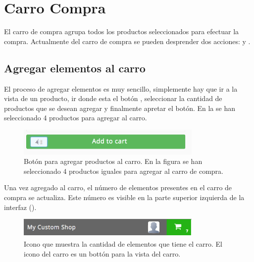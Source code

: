\section{Carro Compra}
	El carro de compra agrupa todos los productos seleccionados para efectuar la compra. Actualmente del carro de compra se pueden desprender dos acciones:  y .

	\subsection{Agregar elementos al carro}\label{chapter:section:carro_compra:subsection:add}
		El proceso de agregar elementos es muy sencillo, simplemente hay que ir a la vista de un producto, ir donde esta el botón \addtocartLABEL, seleccionar la cantidad de productos que se desean agregar y finalmente apretar el botón. En la  se han seleccionado 4 productos para agregar al carro.

		\begin{figure}[H]
			\centering
			\includegraphics[width=0.8\textwidth]{figuras/solution/cart/button.png}
			\caption{Botón para agregar productos al carro. En la figura se han seleccionado 4 productos iguales para agregar al carro de compra.}
			\label{figure:solution:cart:button}
		\end{figure}

		Una vez agregado al carro, el número de elementos presentes en el carro de compra se actualiza. Este número es visible en la parte superior izquierda de la interfaz ().

		\begin{figure}[H]
			\centering
			\includegraphics[width=0.8\textwidth]{figuras/solution/cart/header.png}
			\caption{Icono que muestra la cantidad de elementos que tiene el carro. El icono del carro es un bottón para la vista del carro.}
			\label{figure:solution:cart:header}
		\end{figure}

